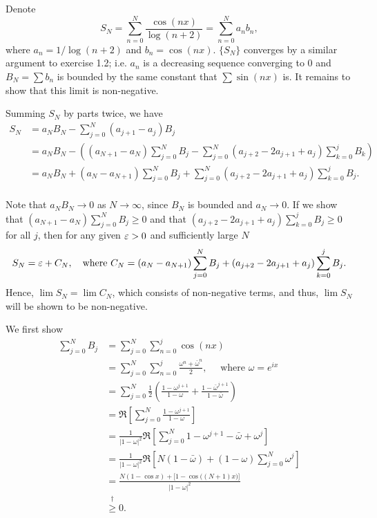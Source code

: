 \documentclass{homework}
\begin{document}
\begin{solution}
Denote 
$$
  S_N = \sum_{n=0}^N \frac{\cos(nx)}{\log(n+2)}= \sum_{n=0}^N a_n b_n,
$$
where $a_n = 1/\log(n+2)$ and $b_n = \cos(nx)$.  $\{S_N\}$ converges by a similar argument to exercise 1.2; i.e. $a_n$ is a decreasing sequence converging to 0 and $B_N = \sum b_n$ is bounded by the same constant that $\sum \sin(nx)$ is.  It remains to show that this limit is non-negative.

Summing $S_N$ by parts twice, we have
\begin{align*}
  S_N &= a_N B_N - \sum_{j=0}^N (a_{j+1} - a_j)B_j \\
  &= a_N B_N - \left( (a_{N+1} - a_N) \sum_{j=0}^NB_j - \sum_{j=0}^N (a_{j+2} - 2a_{j+1} + a_j) \sum_{k=0}^jB_k\right)\\
  &= a_NB_N + (a_N - a_{N+1}) \sum_{j=0}^NB_j + \sum_{j=0}^N (a_{j+2} - 2a_{j+1} + a_j) \sum_{k=0}^jB_j.\\
\end{align*}

Note that $a_N B_N \to 0$ as $N\to \infty$, since $B_N$ is bounded and $a_N\to 0$. If we show that $(a_{N+1} - a_N) \sum_{j=0}^N B_j \ge 0$ and that $(a_{j+2} - 2a_{j+1} + a_j)\sum_{k=0}^j B_j \ge 0$ for all $j$, then for any given $\varepsilon >0$ and sufficiently large $N$
$$
  S_N = \varepsilon + C_N,\quad\text{where }C_N = (a_N - a_{N+1}) \sum_{j=0}^N B_j + (a_{j+2} - 2a_{j+1} + a_j)\sum_{k=0}^j B_j.
$$
Hence, $\lim S_N = \lim C_N$, which consists of non-negative terms, and thus, $\lim S_N$ will be shown to be non-negative.
%

We first show
\begin{align*}
 \sum_{j=0}^N B_j 
 &= \sum_{j=0}^N\sum_{n=0}^j \cos(nx) \\
 &= \sum_{j=0}^N\sum_{n=0}^j \frac{\omega^n + \bar \omega^n}{2},\quad\text{ where }\omega = e^{ix} \\ 
 &= \sum_{j=0}^N \frac 12 \left(\frac{1 - \omega^{j+1}}{1 - \omega} + \frac{1-\bar\omega^{j+1}}{1-\bar\omega} \right)\\ 
 &= \Re\left[ \sum_{j=0}^N \frac{1 - \omega^{j+1}}{1 - \omega} \right]\\ 
 &= \frac{1}{|1-\omega|^2}\Re\left[ \sum_{j=0}^N 1 - \omega^{j+1} -\bar\omega + \omega^j  \right]\\ 
 &= \frac{1}{|1-\omega|^2}\Re\left[  N(1 -\bar\omega) + (1-\omega)\sum_{j=0}^N \omega^j\right]\\ 
 &= \frac{N(1-\cos x) + \Big[1-\cos\Big((N+1)x\Big)\Big]}{|1-\omega|^2} \\
 &\stackrel{\dagger}\ge 0.\\ 
\end{align*}


\end{solution}
\end{document}
